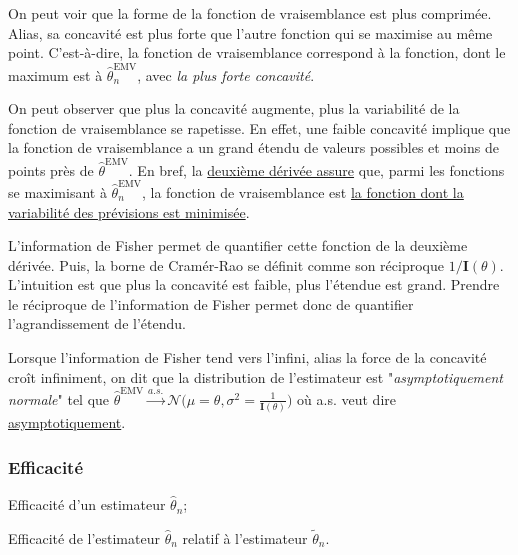 \documentclass[french]{article}
\begin{document}
\begin{multicols*}{2}
On peut voir que la forme de la fonction de vraisemblance est plus comprimée. Alias, sa concavité est plus forte que l'autre fonction qui se maximise au même point. C'est-à-dire, la fonction de vraisemblance correspond à la fonction, dont le maximum est à $\hat{\theta}^{\text{EMV}}_{n}$, avec \textit{la plus forte concavité}.	

\bigskip

On peut observer que plus la concavité augmente, plus la variabilité de la fonction de vraisemblance se rapetisse. En effet, une faible concavité implique que la fonction de vraisemblance a un grand étendu de valeurs possibles et moins de points près de $\hat\theta^{\text{EMV}}$. En bref, la \underline{deuxième dérivée assure} que, parmi les fonctions se maximisant à $\hat{\theta}^{\text{EMV}}_{n}$, la fonction de vraisemblance est \underline{la fonction dont la variabilité des prévisions est minimisée}.	

\bigskip

L'information de Fisher permet de quantifier cette fonction de la deuxième dérivée. Puis, la borne de Cramér-Rao se définit comme son réciproque $1 / \bm{I}(\theta)$. L'intuition est que plus la concavité est faible, plus l'étendue est grand. Prendre le réciproque de l'information de Fisher permet donc de quantifier l'agrandissement de l'étendu.

\bigskip

Lorsque l'information de Fisher tend vers l'infini, alias la force de la concavité croît infiniment, on dit que la distribution de l'estimateur est "\textit{asymptotiquement normale}" tel que $\hat\theta^{\text{EMV}} \overset{a.s.}{\rightarrow} \mathcal{N}\Big(\mu = \theta, \sigma^{2} = \frac{1}{\bm{I}(\theta)}\Big)$ où a.s. veut dire \hyperlink{asympto}{asymptotiquement}.



\columnbreak
\subsubsection{Efficacité}\label{subsubsec:EfficiencyEstim}
\begin{distributions}[Notation]
\begin{description}[font = \normalfont]
	\item[$\text{eff}(\hat{\theta}_{n})$]	Efficacité d'un estimateur $\hat{\theta}_{n}$;
	\item[$\text{eff}(\hat\theta_{n}, \tilde\theta_{n})$]	Efficacité de l'estimateur $\hat{\theta}_{n}$ relatif à l'estimateur $\tilde{\theta}_{n}$.
\end{description}
\end{distributions}


\end{multicols*}
\end{document}
